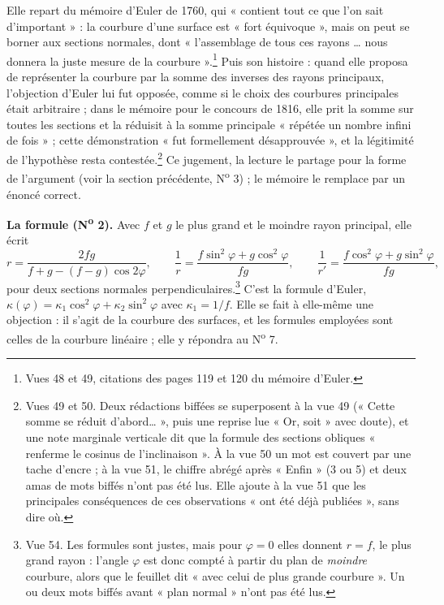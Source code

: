 \documentclass[11pt,a4paper]{article}
\begin{document}
Elle repart du mémoire d'Euler de 1760, qui « contient tout ce que l'on sait
d'important » : la courbure d'une surface est « fort équivoque », mais on peut
se borner aux sections normales, dont « l'assemblage de tous ces rayons … nous
donnera la juste mesure de la courbure ».\footnote{Vues 48 et 49, citations des
pages 119 et 120 du mémoire d'Euler.} Puis son histoire : quand elle proposa de
représenter la courbure par la somme des inverses des rayons principaux,
l'objection d'Euler lui fut opposée, comme si le choix des courbures principales
était arbitraire ; dans le mémoire pour le concours de 1816, elle prit la somme
sur toutes les sections et la réduisit à la somme principale « répétée un
nombre infini de fois » ; cette démonstration « fut formellement désapprouvée »,
et la légitimité de l'hypothèse resta contestée.\footnote{Vues 49 et 50. Deux
rédactions biffées se superposent à la vue 49 (« Cette somme se réduit
d'abord… », puis une reprise lue « Or, soit » avec doute), et une note
marginale verticale dit que la formule des sections obliques « renferme le
cosinus de l'inclinaison ». À la vue 50 un mot est couvert par une tache
d'encre ; à la vue 51, le chiffre abrégé après « Enfin » (3 ou 5) et deux amas
de mots biffés n'ont pas été lus. Elle ajoute à la vue 51 que les principales
conséquences de ces observations « ont été déjà publiées », sans dire où.} Ce
jugement, la lecture le partage pour la forme de l'argument (voir la section
précédente, N\textsuperscript{o} 3) ; le mémoire le remplace par un énoncé
correct.

\textbf{La formule (N\textsuperscript{o} 2).} Avec $f$ et $g$ le plus grand et le
moindre rayon principal, elle écrit
\[
r = \frac{2fg}{f + g - (f-g)\cos 2\varphi},
\qquad
\frac1r = \frac{f\sin^2\varphi + g\cos^2\varphi}{fg},
\qquad
\frac1{r'} = \frac{f\cos^2\varphi + g\sin^2\varphi}{fg},
\]
pour deux sections normales perpendiculaires.\footnote{Vue 54. Les formules sont
justes, mais pour $\varphi = 0$ elles donnent $r = f$, le plus grand rayon :
l'angle $\varphi$ est donc compté à partir du plan de \emph{moindre} courbure,
alors que le feuillet dit « avec celui de plus grande courbure ». Un ou deux mots
biffés avant « plan normal » n'ont pas été lus.} C'est la formule d'Euler,
$\kappa(\varphi) = \kappa_1\cos^2\varphi + \kappa_2\sin^2\varphi$ avec $\kappa_1 =
1/f$. Elle se fait à elle-même une objection : il s'agit de la courbure des
surfaces, et les formules employées sont celles de la courbure linéaire ; elle y
répondra au N\textsuperscript{o} 7.
\end{document}
